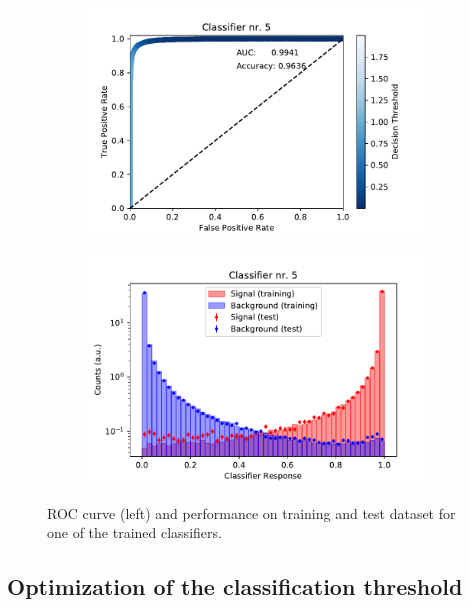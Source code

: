 \begin{figure}
  \centering
  \begin{subfigure}[b]{0.45\textwidth}
    \centering
    \includegraphics[width=\textwidth]{"content/plots/BDT_roc_auc.pdf"}
    \label{fig:roc_curve}
  \end{subfigure}
  \hfill
  \begin{subfigure}[b]{0.45\textwidth}
    \centering
    \includegraphics[width=\textwidth]{"content/plots/BDT_train_test.pdf"}
    \label{fig:train_test}
  \end{subfigure}
  \caption{ROC curve (left) and performance on training and test dataset for one of the trained classifiers.}
  \label{fig:BDT}
\end{figure}

\subsection{Optimization of the classification threshold}

